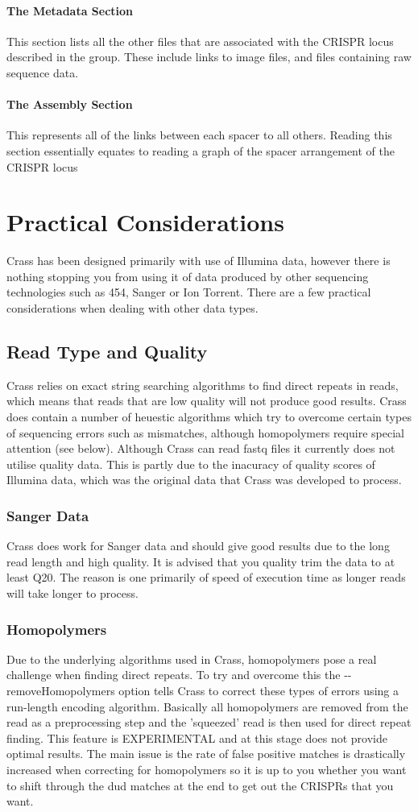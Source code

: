 \documentclass[11pt]{article} %
\begin{document}
\paragraph{The Metadata Section}
This section lists all the other files that are associated with the CRISPR locus described in the group.  These include links to image files, and files containing raw sequence data.
\paragraph{The Assembly Section}
This represents all of the links between each spacer to all others.  Reading this section essentially equates to reading a graph of the spacer arrangement of the CRISPR locus


\section{Practical Considerations}
Crass has been designed primarily with use of Illumina data, however there is nothing stopping you from using it of data produced by other sequencing technologies such as 454, Sanger or Ion Torrent.  There are a few practical considerations when dealing with other data types.
\subsection{Read Type and Quality}
 Crass relies on exact string searching algorithms to find direct repeats in reads, which means that reads that are low quality will not produce good results.  Crass does contain a number of heuestic algorithms which try to overcome certain types of sequencing errors such as mismatches, although homopolymers require special attention (see below).  Although Crass can read fastq files it currently does not utilise quality data.  This is partly due to the inacuracy of quality scores of Illumina data, which was the original data that Crass was developed to process. 
\subsubsection{Sanger Data}
Crass does work for Sanger data and should give good results due to the long read length and high quality.  It is advised that you quality trim the data to at least Q20.  The reason is one primarily of speed of execution time as longer reads will take longer to process.
\subsubsection{Homopolymers}
Due to the underlying algorithms used in Crass, homopolymers pose a real challenge when finding direct repeats.  To try and overcome this the -{}-removeHomopolymers option tells Crass to correct these types of errors using a run-length encoding algorithm.  Basically all homopolymers are removed from the read as a preprocessing step and the 'squeezed' read is then used for direct repeat finding.  This feature is EXPERIMENTAL and at this stage does not provide optimal results.  The main issue is the rate of false positive matches is drastically increased when correcting for homopolymers so it is up to you whether you want to shift through the dud matches at the end to get out the CRISPRs that you want.  
\end{document}
